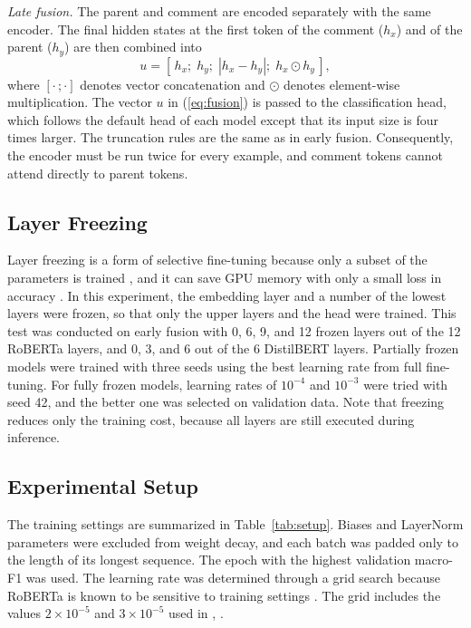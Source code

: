 \documentclass[conference]{IEEEtran}
\begin{document}
\textit{Late fusion.} The parent and comment are encoded separately with the same encoder. The final hidden states at the first token of the comment ($h_x$) and of the parent ($h_y$) are then combined into
\begin{equation}
u = [\,h_x;\; h_y;\; |h_x - h_y|;\; h_x \odot h_y\,],
\label{eq:fusion}
\end{equation}
where $[\cdot\,;\cdot]$ denotes vector concatenation and $\odot$ denotes element-wise multiplication. The vector $u$ in (\ref{eq:fusion}) is passed to the classification head, which follows the default head of each model except that its input size is four times larger. The truncation rules are the same as in early fusion. Consequently, the encoder must be run twice for every example, and comment tokens cannot attend directly to parent tokens.

\subsection{Layer Freezing}
Layer freezing is a form of selective fine-tuning because only a subset of the parameters is trained \cite{han2024peft}, and it can save GPU memory with only a small loss in accuracy \cite{ardakani2024slimfit}. In this experiment, the embedding layer and a number of the lowest layers were frozen, so that only the upper layers and the head were trained. This test was conducted on early fusion with 0, 6, 9, and 12 frozen layers out of the 12 RoBERTa layers, and 0, 3, and 6 out of the 6 DistilBERT layers. Partially frozen models were trained with three seeds using the best learning rate from full fine-tuning. For fully frozen models, learning rates of $10^{-4}$ and $10^{-3}$ were tried with seed 42, and the better one was selected on validation data. Note that freezing reduces only the training cost, because all layers are still executed during inference.

\subsection{Experimental Setup}
The training settings are summarized in Table~\ref{tab:setup}. Biases and LayerNorm parameters were excluded from weight decay, and each batch was padded only to the length of its longest sequence. The epoch with the highest validation macro-F1 was used. The learning rate was determined through a grid search because RoBERTa is known to be sensitive to training settings \cite{jimenez2026bert}. The grid includes the values $2 \times 10^{-5}$ and $3 \times 10^{-5}$ used in \cite{dubey2026efficient}, \cite{ullah2026advanced}.
\end{document}
